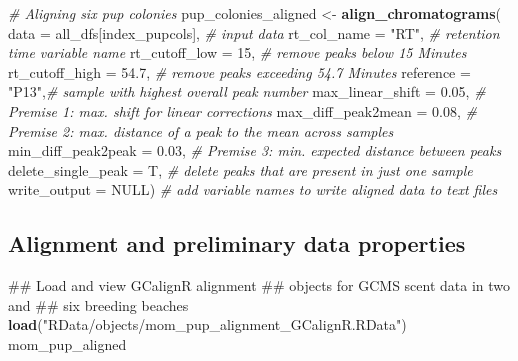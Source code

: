 \documentclass[]{article}
\newenvironment{Shaded}{\begin{snugshade}}{\end{snugshade}}
\newcommand{\KeywordTok}[1]{\textcolor[rgb]{0.13,0.29,0.53}{\textbf{#1}}}
\newcommand{\DataTypeTok}[1]{\textcolor[rgb]{0.13,0.29,0.53}{#1}}
\newcommand{\DecValTok}[1]{\textcolor[rgb]{0.00,0.00,0.81}{#1}}
\newcommand{\FloatTok}[1]{\textcolor[rgb]{0.00,0.00,0.81}{#1}}
\newcommand{\StringTok}[1]{\textcolor[rgb]{0.31,0.60,0.02}{#1}}
\newcommand{\CommentTok}[1]{\textcolor[rgb]{0.56,0.35,0.01}{\textit{#1}}}
\newcommand{\OtherTok}[1]{\textcolor[rgb]{0.56,0.35,0.01}{#1}}
\newcommand{\NormalTok}[1]{#1}
\begin{document}
\begin{Shaded}
\begin{Highlighting}[]
\CommentTok{# Aligning six pup colonies}
\NormalTok{pup_colonies_aligned <-}\StringTok{ }\KeywordTok{align_chromatograms}\NormalTok{(}
  \DataTypeTok{data =}\NormalTok{ all_dfs[index_pupcols], }\CommentTok{# input data}
  \DataTypeTok{rt_col_name =} \StringTok{"RT"}\NormalTok{, }\CommentTok{# retention time variable name }
  \DataTypeTok{rt_cutoff_low =} \DecValTok{15}\NormalTok{, }\CommentTok{# remove peaks below 15 Minutes}
  \DataTypeTok{rt_cutoff_high =} \FloatTok{54.7}\NormalTok{, }\CommentTok{# remove peaks exceeding 54.7 Minutes}
  \DataTypeTok{reference =} \StringTok{"P13"}\NormalTok{,}\CommentTok{# sample with highest overall peak number }
  \DataTypeTok{max_linear_shift =} \FloatTok{0.05}\NormalTok{, }\CommentTok{# Premise 1: max. shift for linear corrections}
  \DataTypeTok{max_diff_peak2mean =} \FloatTok{0.08}\NormalTok{, }\CommentTok{# Premise 2: max. distance of a peak to the mean across samples}
  \DataTypeTok{min_diff_peak2peak =} \FloatTok{0.03}\NormalTok{, }\CommentTok{# Premise 3: min. expected distance between peaks}
  \DataTypeTok{delete_single_peak =}\NormalTok{ T, }\CommentTok{# delete peaks that are present in just one sample }
  \DataTypeTok{write_output =} \OtherTok{NULL}\NormalTok{) }\CommentTok{# add variable names to write aligned data to text files}
\end{Highlighting}
\end{Shaded}

\subsection{Alignment and preliminary data
properties}\label{alignment-and-preliminary-data-properties}

\begin{Shaded}
\begin{Highlighting}[]
\NormalTok{## Load and view GCalignR alignment}
\NormalTok{## objects for GCMS scent data in two and}
\NormalTok{## six breeding beaches}
\KeywordTok{load}\NormalTok{(}\StringTok{"RData/objects/mom_pup_alignment_GCalignR.RData"}\NormalTok{)}
\NormalTok{mom_pup_aligned}
\end{Highlighting}
\end{Shaded}
\end{document}
